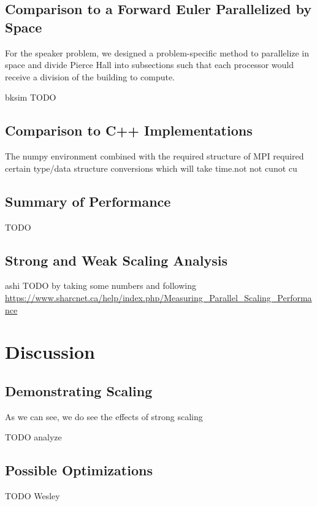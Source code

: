 \documentclass[letterpaper,twocolumn,11pt]{article}
\begin{document}
\subsection{Comparison to a Forward Euler Parallelized by Space}

For the speaker problem, we designed a problem-specific method to parallelize in space and divide Pierce Hall into subsections such that each processor would receive a division of the building to compute.

bksim TODO

\subsection{Comparison to C++ Implementations}

The numpy environment combined with the required structure of MPI required
certain type/data structure conversions which will take time.not not cunot
cu

\subsection{Summary of Performance}

TODO

\subsection{Strong and Weak Scaling Analysis}

ashi TODO by taking some numbers and following
\url{https://www.sharcnet.ca/help/index.php/Measuring_Parallel_Scaling_Performance}

\section{Discussion}

\subsection{Demonstrating Scaling}

As we can see, we do see the effects of strong scaling

TODO analyze


\subsection{Possible Optimizations}

TODO Wesley
\end{document}
